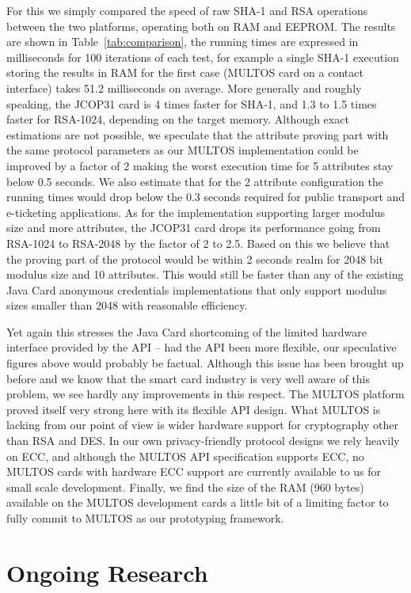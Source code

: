 For this we simply compared the speed of raw SHA-1 and RSA operations
between the two platforms, operating both on RAM and EEPROM.  The
results are shown in Table~\ref{tab:comparison}, the running times are
expressed in milliseconds for 100 iterations of each test, for example
a single SHA-1 execution storing the results in RAM for the first case (MULTOS
card on a contact interface) takes 51.2 milliseconds on average.
More generally and roughly speaking,
the JCOP31 card is 4 times faster for SHA-1, and 1.3 to 1.5 times
faster for RSA-1024, depending on the target memory.
Although exact estimations are not possible, we
speculate that the attribute proving part with the same protocol
parameters as our MULTOS implementation could be improved by a factor
of 2 making the worst execution time for 5 attributes stay below 0.5 seconds.
We also estimate that for the 2 attribute configuration the running times
would drop below the 0.3 seconds required for public transport and e-ticketing applications.
As for the implementation supporting
larger modulus size and more attributes, the JCOP31 card drops
its performance going from RSA-1024 to RSA-2048 by the factor of 2 to 2.5.
Based on this we believe that the
proving part of the protocol would be within 2 seconds realm for 2048
bit modulus size and 10 attributes. This would still be faster
than any of the existing Java Card anonymous credentials
implementations that only support modulus sizes smaller than 2048
with reasonable efficiency.

Yet again this stresses the Java Card shortcoming of the limited
hardware interface provided by the API -- had the API been more
flexible, our speculative figures above would probably be factual.
Although this issue has been brought up before and we know
that the smart card industry is very well aware of this problem, we
see hardly any improvements in this respect. The MULTOS platform
proved itself very strong here with its flexible API design. What
MULTOS is lacking from our point of view is wider hardware support for
cryptography other than RSA and DES. In our own privacy-friendly protocol
designs we rely heavily on ECC, and although the MULTOS API
specification supports ECC, no MULTOS cards with hardware ECC support are
currently available to us for small scale development.
Finally, we find the size of the RAM
(960 bytes) available on the MULTOS development cards a little bit of
a limiting factor to fully commit to MULTOS as our prototyping
framework.

\section{Ongoing Research}\label{sec:future}

